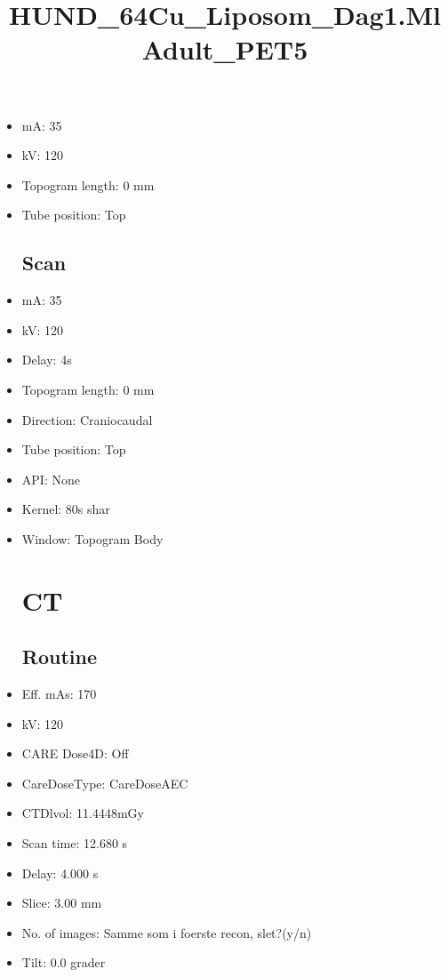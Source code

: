 \documentclass[12pt]{article}
\title{HUND\_64Cu\_Liposom\_Dag1.MlAdult\_PET5}
\begin{document}
\maketitle
\newpage
\tableofcontents
\newpage
{}


\begin{itemize}\section{Topogram}
\subsection{Routine}
\item mA: 35\item kV: 120\item Topogram length: 0 mm\item Tube position: Top
\subsection{Scan}\item mA: 35\item kV: 120\item Delay: 4s\item Topogram length: 0 mm\item Direction: Craniocaudal\item Tube position: Top\item API: None\item Kernel: 80s shar\item Window: Topogram Body
\section{CT }
\subsection{Routine}
\item Eff. mAs: 170\item kV: 120\item CARE Dose4D: Off\item CareDoseType: CareDoseAEC\item CTDlvol: 11.4448mGy\item Scan time: 12.680 s\item Delay: 4.000 s\item Slice: 3.00 mm\item No. of images: Samme som i foerste recon, slet?(y/n)\item Tilt: 0.0 grader

\end{itemize}
\end{document}
